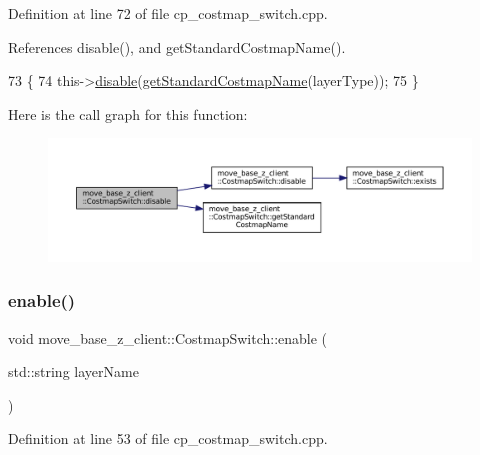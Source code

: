 Definition at line 72 of file cp\+\_\+costmap\+\_\+switch.\+cpp.



References disable(), and get\+Standard\+Costmap\+Name().


\begin{DoxyCode}
73 \{
74     this->\hyperlink{classmove__base__z__client_1_1CostmapSwitch_a14a70c2952a2bf34b2f8a383fdd5841f}{disable}(\hyperlink{classmove__base__z__client_1_1CostmapSwitch_ae8635d58b81be774e18eb4afa99413e1}{getStandardCostmapName}(layerType));
75 \}
\end{DoxyCode}
Here is the call graph for this function\+:
\nopagebreak
\begin{figure}[H]
\begin{center}
\leavevmode
\includegraphics[width=350pt]{classmove__base__z__client_1_1CostmapSwitch_acc493a0039e529f11b3f49818f38c5ff_cgraph}
\end{center}
\end{figure}
\mbox{\label{classmove__base__z__client_1_1CostmapSwitch_ab605fa05a9e899c58f8502990e91586a}} 
\subsubsection{\texorpdfstring{enable()}{enable()}\hspace{0.1cm}{\footnotesize\ttfamily [1/2]}}
{\footnotesize\ttfamily void move\+\_\+base\+\_\+z\+\_\+client\+::\+Costmap\+Switch\+::enable (\begin{DoxyParamCaption}\item[{std\+::string}]{layer\+Name }\end{DoxyParamCaption})}



Definition at line 53 of file cp\+\_\+costmap\+\_\+switch.\+cpp.



